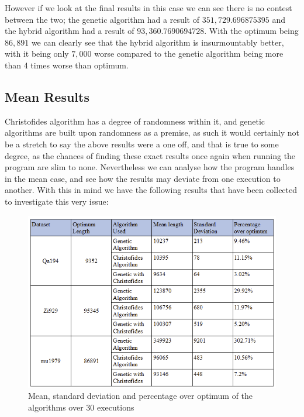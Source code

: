 \documentclass[11pt,a4paper,titlepage]{article}
\begin{document}
However if we look at the final results in this case we can see there is no contest between the two; the genetic algorithm had a result of $351,729.696875395$ and the hybrid algorithm had a result of $93,360.7690694728$. With the optimum being $86,891$ we can clearly see that the hybrid algorithm is insurmountably better, with it being only $7,000$ worse compared to the genetic algorithm being more than 4 times worse than optimum.

\subsection{Mean Results}

Christofides algorithm has a degree of randomness within it, and genetic algorithms are built upon randomness as a premise, as such it would certainly not be a stretch to say the above results were a one off, and that is true to some degree, as the chances of finding these exact results once again when running the program are slim to none. Nevertheless we can analyse how the program handles in the mean case, and see how the results may deviate from one execution to another. With this in mind we have the following results that have been collected to investigate this very issue:

\begin{figure}[ht]
	\includegraphics[width=\textwidth]{MeanResults}
	\centering
	\caption{Mean, standard deviation and percentage over optimum of the algorithms over 30 executions}
\end{figure}
\end{document}
